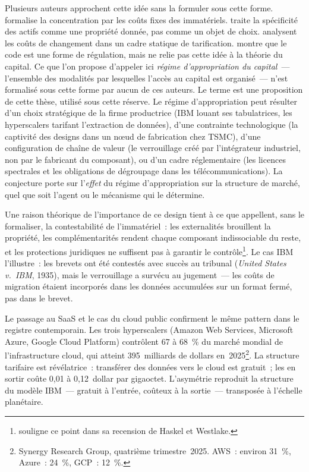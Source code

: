 Plusieurs auteurs approchent cette idée sans la formuler sous cette forme. \textcite{de_ridder_2024} formalise la concentration par les coûts fixes des immatériels. \textcite{williamson_economic_1985} traite la spécificité des actifs comme une propriété donnée, pas comme un objet de choix. \textcite{shapiro_varian_1999} analysent les coûts de changement dans un cadre statique de tarification. \textcite{lessig_code_1999} montre que le code est une forme de régulation, mais ne relie pas cette idée à la théorie du capital. Ce que l'on propose d'appeler ici \emph{régime d'appropriation du capital}~--- l'ensemble des modalités par lesquelles l'accès au capital est organisé~--- n'est formalisé sous cette forme par aucun de ces auteurs. Le terme est une proposition de cette thèse, utilisé sous cette réserve. Le régime d'appropriation peut résulter d'un choix stratégique de la firme productrice (IBM louant ses tabulatrices, les hyperscalers tarifant l'extraction de données), d'une contrainte technologique (la captivité des designs dans un n\oe ud de fabrication chez TSMC), d'une configuration de chaîne de valeur (le verrouillage créé par l'intégrateur industriel, non par le fabricant du composant), ou d'un cadre réglementaire (les licences spectrales et les obligations de dégroupage dans les télécommunications). La conjecture porte sur l'\emph{effet} du régime d'appropriation sur la structure de marché, quel que soit l'agent ou le mécanisme qui le détermine.

Une raison théorique de l'importance de ce design tient à ce que \textcite{haskel_capitalism_2018} appellent, sans le formaliser, la contestabilité de l'immatériel~: les externalités brouillent la propriété, les complémentarités rendent chaque composant indissociable du reste, et les protections juridiques ne suffisent pas à garantir le contrôle\footnote{\textcite{dumez_croissance_2018} souligne ce point dans sa recension de Haskel et Westlake.}. Le cas IBM l'illustre~: les brevets ont été contestés avec succès au tribunal (\emph{United States v.~IBM}, 1935), mais le verrouillage a survécu au jugement~--- les coûts de migration étaient incorporés dans les données accumulées sur un format fermé, pas dans le brevet.

Le passage au SaaS et le cas du cloud public confirment le même pattern dans le registre contemporain. Les trois hyperscalers (Amazon Web Services, Microsoft Azure, Google Cloud Platform) contrôlent 67 à 68~\% du marché mondial de l'infrastructure cloud, qui atteint 395~milliards de dollars en~2025\footnote{Synergy Research Group, quatrième trimestre~2025. AWS~: environ 31~\%, Azure~: 24~\%, GCP~: 12~\%.}. La structure tarifaire est révélatrice~: transférer des données vers le cloud est gratuit~; les en sortir coûte 0,01 à 0,12~dollar par gigaoctet. L'asymétrie reproduit la structure du modèle IBM~--- gratuit à l'entrée, coûteux à la sortie~--- transposée à l'échelle planétaire.

